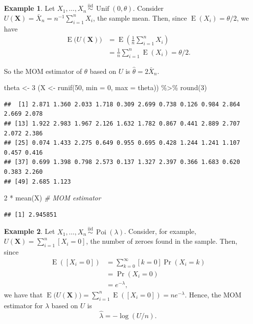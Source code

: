 \documentclass[
]{book}
\newenvironment{Shaded}{\begin{snugshade}}{\end{snugshade}}
\newcommand{\AttributeTok}[1]{\textcolor[rgb]{0.77,0.63,0.00}{#1}}
\newcommand{\CommentTok}[1]{\textcolor[rgb]{0.56,0.35,0.01}{\textit{#1}}}
\newcommand{\DecValTok}[1]{\textcolor[rgb]{0.00,0.00,0.81}{#1}}
\newcommand{\FunctionTok}[1]{\textcolor[rgb]{0.00,0.00,0.00}{#1}}
\newcommand{\NormalTok}[1]{#1}
\newcommand{\OtherTok}[1]{\textcolor[rgb]{0.56,0.35,0.01}{#1}}
\newcommand{\SpecialCharTok}[1]{\textcolor[rgb]{0.00,0.00,0.00}{#1}}
\newcommand{\bX}{{\boldsymbol X}}
\DeclareMathOperator{\E}{E}
\DeclareMathOperator{\Pois}{Poi}
\DeclareMathOperator{\Unif}{Unif}
\newcommand{\iid}{\,\overset{\text{iid}}{\sim}\,}
\theoremstyle{definition}
\theoremstyle{definition}
\newtheorem{example}{Example}[chapter]
\theoremstyle{definition}
\theoremstyle{definition}
\theoremstyle{remark}
\begin{document}
\begin{example}

Let \(X_1,\dots,X_n\iid\Unif(0,\theta)\). Consider \(U(\bX) = \bar X_n = n^{-1}\sum_{i=1}^n X_i\), the sample mean. Then, since \(\E(X_i)=\theta/2\), we have
\begin{align*}
\E\big(U(\bX) \big) 
&= \E\left(\frac{1}{n} \sum_{i=1}^n X_i \right) \\
&= \frac{1}{n} \sum_{i=1}^n \E\left( X_i \right) = \theta/2.
\end{align*}

So the MOM estimator of \(\theta\) based on \(U\) is \(\hat\theta = 2\bar X_n\).

\begin{Shaded}
\begin{Highlighting}[]
\NormalTok{theta }\OtherTok{\textless{}{-}} \DecValTok{3}
\NormalTok{(X }\OtherTok{\textless{}{-}} \FunctionTok{runif}\NormalTok{(}\DecValTok{50}\NormalTok{, }\AttributeTok{min =} \DecValTok{0}\NormalTok{, }\AttributeTok{max =}\NormalTok{ theta)) }\SpecialCharTok{\%\textgreater{}\%} 
    \FunctionTok{round}\NormalTok{(}\DecValTok{3}\NormalTok{)}
\end{Highlighting}
\end{Shaded}

\begin{verbatim}
##  [1] 2.871 1.360 2.033 1.718 0.309 2.699 0.738 0.126 0.984 2.864 2.669 2.078
## [13] 1.922 2.983 1.967 2.126 1.632 1.782 0.867 0.441 2.889 2.707 2.072 2.386
## [25] 0.074 1.433 2.275 0.649 0.955 0.695 0.428 1.244 1.241 1.107 0.457 0.416
## [37] 0.699 1.398 0.798 2.573 0.137 1.327 2.397 0.366 1.683 0.620 0.383 2.260
## [49] 2.685 1.123
\end{verbatim}

\begin{Shaded}
\begin{Highlighting}[]
\DecValTok{2} \SpecialCharTok{*} \FunctionTok{mean}\NormalTok{(X)  }\CommentTok{\# MOM estimator}
\end{Highlighting}
\end{Shaded}

\begin{verbatim}
## [1] 2.945851
\end{verbatim}

\end{example}

\begin{example}
Let \(X_1,\dots,X_n\iid\Pois(\lambda)\). Consider, for example, \(U(\bX)=\sum_{i=1}^n [X_i=0]\), the number of zeroes found in the sample. Then, since
\begin{align*}
\E([X_i=0]) 
&= \sum_{k=0}^\infty [k=0]\Pr(X_i=k) \\
&= \Pr(X_i=0) \\
&= e^{-\lambda},
\end{align*}
we have that \(\E\big( U(\bX) \big) = \sum_{i=1}^n \E([X_i=0]) = ne^{-\lambda}\). Hence, the MOM estimator for \(\lambda\) based on \(U\) is
\[
\hat\lambda = -\log(U/n).
\]
\end{example}
\end{document}
